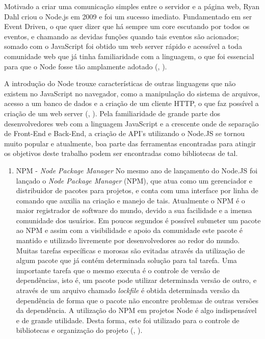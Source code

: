 \begin{enumerate}
Motivado a criar uma comunicação simples entre o servidor e a página web, Ryan Dahl criou o Node.js em 2009 e foi um sucesso imediato. Fundamentado em ser Event Driven, o que quer dizer que há sempre um core escutando por todos os eventos, e chamando as devidas funções quando tais eventos são acionados; somado com o JavaScript foi obtido um web server rápido e acessível a toda comunidade web que já tinha familiaridade com a linguagem, o que foi essencial para que o Node fosse tão amplamente adotado (\citeauthor{shah2017node}, \citeyear{shah2017node}).

A introdução do Node trouxe características de outras linguagens que não existem no JavaScript no navegador, como a manipulação do sistema de arquivos, acesso a um banco de dados e a criação de um cliente HTTP, o que faz possível a criação de um web server  (\citeauthor{mead2018learning}, \citeyear{mead2018learning}). Pela familiaridade de grande parte dos desenvolvedores web com a linguagem JavaScript e a crescente onde de separação de Front-End e Back-End, a criação de API's utilizando o Node.JS se tornou muito popular e atualmente, boa parte das ferramentas encontradas para atingir os objetivos deste trabalho podem ser encontradas como bibliotecas de tal.

\begin{enumerate}
    \item NPM - \textit{Node Package Manager}
    No mesmo ano de lançamento do Node.JS foi lançado o \textit{Node Package Manager} (NPM), que atua como um gerenciador e distribuidor de pacotes para projetos, e conta com uma interface por linha de comando que auxilia na criação e manejo de tais. 
    Atualmente o NPM é o maior registrador de software do mundo, devido a sua facilidade e a imensa comunidade dos usuários. 
    Em poucos segundos é possível submeter um pacote ao NPM e assim com a visibilidade e apoio da comunidade este pacote é mantido e utilizado livremente por desenvolvedores ao redor do mundo. Muitas tarefas específicas e morosas são evitadas através da utilização de algum pacote que já contém determinada solução para tal tarefa.
    Uma importante tarefa que o mesmo executa é o controle de versão de dependências, isto é, um pacote pode utilizar determinada versão de outro, e através de um arquivo chamado \textit{lockfile} é obtida determinada versão da dependência de forma que o pacote não encontre problemas de outras versões da dependência. A utilização do NPM em projetos Node é algo indispensável e de grande utilidade. Desta forma, este foi utilizado para o controle de bibliotecas e organização do projeto (\citeauthor{npm}, \citeyear{npm}).


\end{enumerate}
\end{enumerate}
